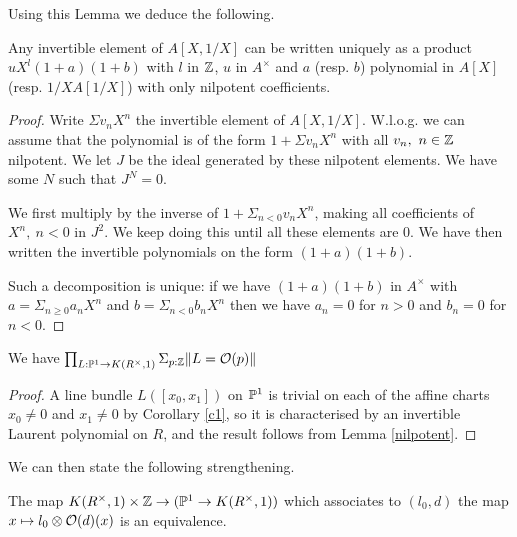  Using this Lemma we deduce the following.

\begin{lemma}\label{nilpotent}
  Any invertible element of $A[X,1/X]$ can be written uniquely as a product
  $uX^l(1+a)(1+b)$ with $l$ in $\mathbb{Z}$, $u$ in $A^{\times}$ and $a$ (resp. $b$)
  polynomial in $A[X]$ (resp. $1/XA[1/X]$) with only nilpotent coefficients.
\end{lemma}

\begin{proof}
  Write $\Sigma v_nX^n$ the invertible element of $A[X,1/X]$.
  W.l.o.g. we can assume that the polynomial is of the form $1 + \Sigma v_nX^n$ with
  all $v_n,~n\in \mathbb{Z}$ nilpotent.
  We let $J$ be the ideal generated by these nilpotent elements.
  We have some $N$ such that $J^N = 0$.
  
  We first multiply by the inverse of $1 + \Sigma_{n<0}v_nX^n$, making all coefficients of
  $X^n,~n<0$ in $J^2$.
  We keep doing this until all these elements are $0$.
  We have then written the invertible polynomials on the form $(1+a)(1+b)$.

  Such a decomposition is unique: if we have $(1+a)(1+b)$ in $A^{\times}$ with $a = \Sigma_{n\geqslant 0}a_nX^n$
  and $b = \Sigma_{n<0}b_nX^n$ then we have $a_n = 0$ for $n>0$ and $b_n = 0$ for $n<0$.
\end{proof}

\begin{corollary}\label{Pic1}
  We have $\prod_{L:\mathbb{P}^1\rightarrow K(R^{\times},1)}\Sigma_{p:\mathbb{Z}}\|L = \mathcal{O}(p)\|$
\end{corollary}

\begin{proof}
A line bundle $L([x_0,x_1])$ on $\mathbb{P}^1$ is trivial on each of the affine charts $x_0\neq 0$ and $x_1\neq 0$ by Corollary \ref{c1}, so
it is characterised by an invertible Laurent polynomial on $R$, and the result follows from Lemma \ref{nilpotent}.
\end{proof}

We can then state the following strengthening.

\begin{proposition}\label{Matthias}
  The map $K(R^{\times},1)\times\mathbb{Z}\rightarrow (\mathbb{P}^1\rightarrow K(R^{\times},1))$
  which associates to $(l_0,d)$ the map $x\mapsto l_0\otimes \mathcal{O}(d)(x)$ is an equivalence.
\end{proposition}

